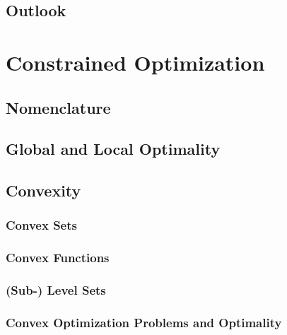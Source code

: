         \subsection{Outlook} %

    \section{Constrained Optimization} %

        \subsection{Nomenclature} %

        \subsection{Global and Local Optimality} %

        \subsection{Convexity} %

            \subsubsection{Convex Sets} %

            \subsubsection{Convex Functions} %

            \subsubsection{(Sub-) Level Sets} %

            \subsubsection{Convex Optimization Problems and Optimality} %

